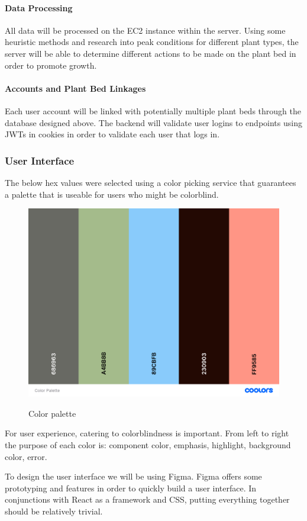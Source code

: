\paragraph{Data Processing}
All data will be processed on the EC2 instance within the server. Using some heuristic methods and research into peak conditions for different plant types, the server will be able to determine different actions to be made on the plant bed in order to promote growth.
\paragraph{Accounts and Plant Bed Linkages}
Each user account will be linked with potentially multiple plant beds through the database designed above. The backend will validate user logins to endpoints using JWTs in cookies in order to validate each user that logs in.
\subsubsection{User Interface}
The below hex values were selected using a color picking service that guarantees a palette that is useable for users who might be colorblind.
\begin{figure}[H]
    \caption{Color palette}
    \centering
    \includegraphics[width=\textwidth]{images/Color Palette.png}
    \label{fig:color_palette}
\end{figure}
For user experience, catering to colorblindness is important. From left to right the purpose of each color is: component color, emphasis, highlight, background color, error.

To design the user interface we will be using Figma. Figma offers some prototyping and features in order to quickly build a user interface. In conjunctions with React as a framework and CSS, putting everything together should be relatively trivial.